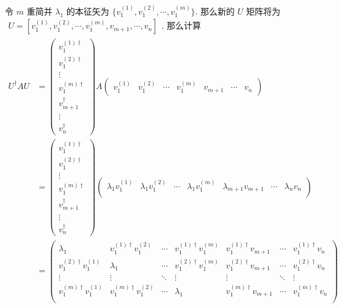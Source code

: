 \documentclass[../../main.tex]{subfiles}
\begin{document}
\begin{enumerate}
{{\begin{enumerate}
      令 $m$ 重简并 $\lambda_{1}$ 的本征矢为 $\{v_{1}^{(1)},v_{1}^{(2)},\cdots,v_{1}^{(m)}\}$. 那么新的 $U$ 矩阵将为 $\begin{aligned}
        U = \left[v_{1}^{(1)},v_{1}^{(2)},\cdots,v_{1}^{(m)},v_{m+1},\cdots,v_{n}\right]
      \end{aligned}$. 那么计算
      \begin{align*}
        U^{\dagger}AU &= \begin{pmatrix}
          v_{1}^{(1)\dagger} \\ v_{1}^{(2)\dagger} \\ \vdots \\ v_{1}^{(m)\dagger} \\ v_{m+1}^{\dagger} \\ \vdots \\ v_{n}^{\dagger}
        \end{pmatrix}A\begin{pmatrix}
          v_{1}^{(1)} & v_{1}^{(2)} & \cdots & v_{1}^{(m)} & v_{m+1} & \cdots & v_{n}
        \end{pmatrix}\\
        &= \begin{pmatrix}
          v_{1}^{(1)\dagger} \\ v_{1}^{(2)\dagger} \\ \vdots \\ v_{1}^{(m)\dagger} \\ v_{m+1}^{\dagger} \\ \vdots \\ v_{n}^{\dagger}
        \end{pmatrix}\begin{pmatrix}
          \lambda_{1}v_{1}^{(1)} & \lambda_{1}v_{1}^{(2)} & \cdots & \lambda_{1}v_{1}^{(m)} & \lambda_{m+1}v_{m+1} & \cdots & \lambda_{n}v_{n} \\
        \end{pmatrix}\\
        &= \begin{pmatrix}
          \lambda_{1} & v_{1}^{(1)\dagger}v_{1}^{(2)} & \cdots & v_{1}^{(1)\dagger}v_{1}^{(m)} & v_{1}^{(1)\dagger}v_{m+1} & \cdots & v_{1}^{(1)\dagger}v_{n} \\
          v_{1}^{(2)\dagger}v_{1}^{(1)} & \lambda_{1} & \cdots & v_{1}^{(2)\dagger}v_{1}^{(m)} & v_{1}^{(2)\dagger}v_{m+1} & \cdots & v_{1}^{(2)\dagger}v_{n} \\
          \vdots & \vdots & \ddots & \vdots & \vdots & \ddots & \vdots \\
          v_{1}^{(m)\dagger}v_{1}^{(1)} & v_{1}^{(m)\dagger}v_{1}^{(2)} & \cdots & \lambda_{1} & v_{1}^{(m)\dagger}v_{m+1} & \cdots & v_{1}^{(m)\dagger}v_{n} \\

\end{pmatrix}
\end{align*}
\end{enumerate}}}
\end{enumerate}
\end{document}
